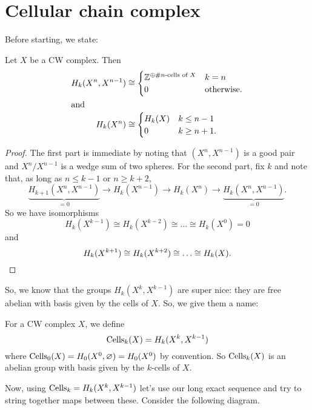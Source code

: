\section{Cellular chain complex}
Before starting, we state:
\begin{lemma}
	Let $X$ be a CW complex. Then
	\begin{align*}
		H_k(X^n, X^{n-1}) &\cong
		\begin{cases}
			\mathbb Z^{\oplus\text{\#$n$-cells of $X$}} & k = n \\
			0 & \text{otherwise}.
		\end{cases} \\
		\intertext{and}
		H_k(X^n) &\cong
		\begin{cases}
			H_k(X) & k \le n-1 \\
			0 & k \ge n+1.
		\end{cases}
	\end{align*}
\end{lemma}
\begin{proof}
	The first part is immediate by noting that $(X^n, X^{n-1})$ is a good pair
	and $X^n/X^{n-1}$ is a wedge sum of two spheres.
	For the second part, fix $k$ and note that, as long as $n \le k-1$ or $n \ge k+2$,
	\[
		\underbrace{H_{k+1}(X^n, X^{n-1})}_{=0}
		\to H_k(X^{n-1})
		\to H_k(X^n)
		\to \underbrace{H_{k}(X^n, X^{n-1})}_{=0}.
	\]
	So we have isomorphisms
	\[ H_k(X^{k-1}) \cong H_k(X^{k-2}) \cong \dots \cong H_k(X^0) = 0 \]
	and
	\[ H_k(X^{k+1}) \cong H_k(X^{k+2}) \cong \dots \cong H_k(X). \qedhere \]
\end{proof}

So, we know that the groups $H_k(X^k, X^{k-1})$ are super nice:
they are free abelian with basis given by the cells of $X$.
So, we give them a name:
\begin{definition}
	For a CW complex $X$, we define
	\[ \operatorname{Cells}_k(X) = H_k(X^k, X^{k-1}) \]
	where $\operatorname{Cells}_0(X) = H_0(X^0, \varnothing) = H_0(X^0)$ by convention.
	So $\operatorname{Cells}_k(X)$ is an abelian group with basis given by
	the $k$-cells of $X$.
\end{definition}

Now, using $\operatorname{Cells}_k = H_k(X^k, X^{k-1})$ let's use
our long exact sequence and try to string together maps between these.
Consider the following diagram.

